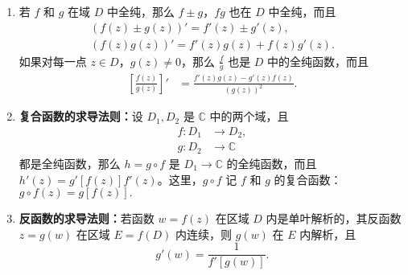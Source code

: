 \documentclass[../../main.tex]{subfiles}
\begin{document}
\begin{proposition}\label{proposition:复变函数求导运算法则}
\begin{enumerate}[(1)]
\item 若 \( f \) 和 \( g \) 在域 \( D \) 中全纯，那么 \( f \pm g \)，\( fg \) 也在 \( D \) 中全纯，而且
\begin{gather*}
(f(z) \pm g(z))' = f'(z) \pm g'(z), \\
(f(z)g(z))' = f'(z)g(z) + f(z)g'(z).
\end{gather*}
如果对每一点 \( z \in D \)，\( g(z) \neq 0 \)，那么 \( \frac{f}{g} \) 也是 \( D \) 中的全纯函数，而且
\begin{align*}
\left[ \frac{f(z)}{g(z)} \right]' &= \frac{f'(z)g(z) - g'(z)f(z)}{(g(z))^2}.
\end{align*}

\item \textbf{复合函数的求导法则：}设 \( D_1, D_2 \) 是 \( \mathbb{C} \) 中的两个域，且
\begin{align*}
f: D_1 &\to D_2, \\
g: D_2 &\to \mathbb{C}
\end{align*}
都是全纯函数，那么 \( h = g \circ f \) 是 \( D_1 \to \mathbb{C} \) 的全纯函数，而且 \( h'(z) = g'[f(z)]f'(z) \)。这里，\( g \circ f \) 记 \( f \) 和 \( g \) 的复合函数：\( g \circ f(z) = g[f(z)] .\)

\item \textbf{反函数的求导法则：}若函数 \( w = f(z) \) 在区域 \( D \) 内是单叶解析的，其反函数 \( z = g(w) \) 在区域 \( E = f(D) \) 内连续，则 \( g(w) \) 在 \( E \) 内解析，且
\[
g'(w) = \frac{1}{f'[g(w)]}.
\]
\end{enumerate}
\end{proposition}
\end{document}

